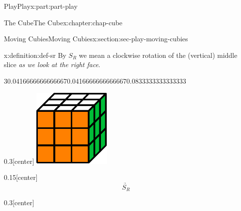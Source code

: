 \documentclass[oneside,10pt,]{book}
\numberwithin{equation}{section}
\begin{document}
\begin{partptx}{Play}{}{Play}{}{}{x:part:part-play}
\begin{chapterptx}{The Cube}{}{The Cube}{}{}{x:chapter:chap-cube}
\begin{sectionptx}{Moving Cubies}{}{Moving Cubies}{}{}{x:section:sec-play-moving-cubies}
\begin{definition}{}{x:definition:def-sr}
By \(S_R\) we mean a clockwise rotation of the (vertical) middle slice \emph{as we look at the right face}.%
\begin{sidebyside}{3}{0.0416666666666667}{0.0416666666666667}{0.0833333333333333}%
\begin{sbspanel}{0.3}[center]%
\includegraphics[width=\linewidth]{./images/solved_cube.pdf}
\end{sbspanel}%
\begin{sbspanel}{0.15}[center]%
%
\begin{equation*}
\underrightarrow{\quad S_R\quad}
\end{equation*}
%
\end{sbspanel}%
\begin{sbspanel}{0.3}[center]%

\end{sbspanel}
\end{sidebyside}
\end{definition}
\end{sectionptx}
\end{chapterptx}
\end{partptx}
\end{document}
